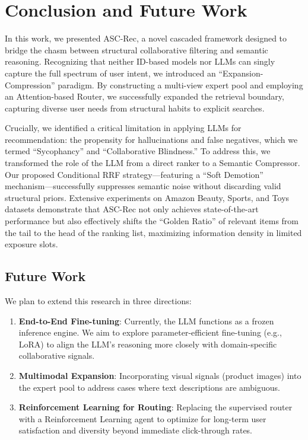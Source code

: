 \section{Conclusion and Future Work}
\label{sec:conclusion}

In this work, we presented ASC-Rec, a novel cascaded framework designed to bridge the chasm between structural collaborative filtering and semantic reasoning. Recognizing that neither ID-based models nor LLMs can singly capture the full spectrum of user intent, we introduced an ``Expansion-Compression'' paradigm. By constructing a multi-view expert pool and employing an Attention-based Router, we successfully expanded the retrieval boundary, capturing diverse user needs from structural habits to explicit searches.

Crucially, we identified a critical limitation in applying LLMs for recommendation: the propensity for hallucinations and false negatives, which we termed ``Sycophancy'' and ``Collaborative Blindness.'' To address this, we transformed the role of the LLM from a direct ranker to a Semantic Compressor. Our proposed Conditional RRF strategy---featuring a ``Soft Demotion'' mechanism---successfully suppresses semantic noise without discarding valid structural priors. Extensive experiments on Amazon Beauty, Sports, and Toys datasets demonstrate that ASC-Rec not only achieves state-of-the-art performance but also effectively shifts the ``Golden Ratio'' of relevant items from the tail to the head of the ranking list, maximizing information density in limited exposure slots.

\subsection{Future Work}
We plan to extend this research in three directions:

\begin{enumerate}
    \item \textbf{End-to-End Fine-tuning}: Currently, the LLM functions as a frozen inference engine. We aim to explore parameter-efficient fine-tuning (e.g., LoRA) to align the LLM's reasoning more closely with domain-specific collaborative signals.
    
    \item \textbf{Multimodal Expansion}: Incorporating visual signals (product images) into the expert pool to address cases where text descriptions are ambiguous.
    
    \item \textbf{Reinforcement Learning for Routing}: Replacing the supervised router with a Reinforcement Learning agent to optimize for long-term user satisfaction and diversity beyond immediate click-through rates.
\end{enumerate}